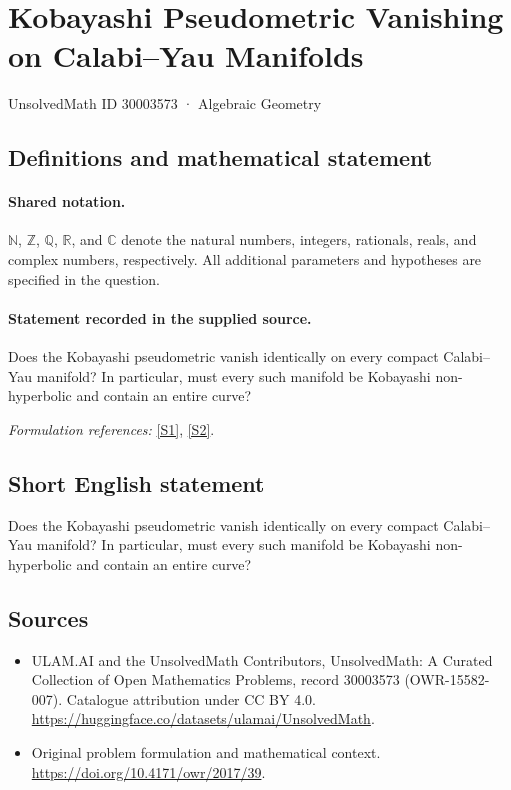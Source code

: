 \documentclass[11pt]{article}
\newcommand{\sref}[2]{\hyperlink{source:#1:#2}{[S#2]}}
\begin{document}
\setcounter{section}{30003572}
\section{Kobayashi Pseudometric Vanishing on Calabi–Yau Manifolds}\label{30003573}
{\small UnsolvedMath ID 30003573 · Algebraic Geometry}
\subsection{Definitions and mathematical statement}

\paragraph{Shared notation.}$\mathbb N$, $\mathbb Z$, $\mathbb Q$, $\mathbb R$, and $\mathbb C$ denote the natural numbers, integers, rationals, reals, and complex numbers, respectively. All additional parameters and hypotheses are specified in the question.


\paragraph{Statement recorded in the supplied source.}
Does the Kobayashi pseudometric vanish identically on every compact Calabi–Yau manifold? In particular, must every such manifold be Kobayashi non-hyperbolic and contain an entire curve?
\par\smallskip\textit{Formulation references:} \sref{30003573}{1}, \sref{30003573}{2}.
\subsection{Short English statement}
Does the Kobayashi pseudometric vanish identically on every compact Calabi–Yau manifold? In particular, must every such manifold be Kobayashi non-hyperbolic and contain an entire curve?
\subsection{Sources}
\begin{itemize}
\item[\hypertarget{source:30003573:1}{S1}] ULAM.AI and the UnsolvedMath Contributors, UnsolvedMath: A Curated Collection of Open Mathematics Problems, record 30003573 (OWR-15582-007). Catalogue attribution under CC BY 4.0.
\url{https://huggingface.co/datasets/ulamai/UnsolvedMath}.
\item[\hypertarget{source:30003573:2}{S2}] Original problem formulation and mathematical context.
\url{https://doi.org/10.4171/owr/2017/39}.
\end{itemize}
\label{end:30003573}
\end{document}
